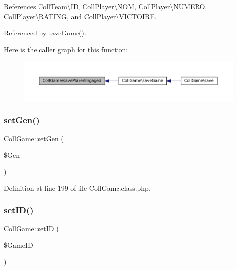 References Coll\+Team\textbackslash{}\+ID, Coll\+Player\textbackslash{}\+N\+OM, Coll\+Player\textbackslash{}\+N\+U\+M\+E\+RO, Coll\+Player\textbackslash{}\+R\+A\+T\+I\+NG, and Coll\+Player\textbackslash{}\+V\+I\+C\+T\+O\+I\+RE.



Referenced by save\+Game().

Here is the caller graph for this function\+:\nopagebreak
\begin{figure}[H]
\begin{center}
\leavevmode
\includegraphics[width=350pt]{class_coll_game_a888d595abf397fe39d4d81833e92ad61_icgraph}
\end{center}
\end{figure}
\mbox{\label{class_coll_game_a6b4d0f6fc49965d0588f4b5399a4fc4e}} 
\subsubsection{\texorpdfstring{set\+Gen()}{setGen()}}
{\footnotesize\ttfamily Coll\+Game\+::set\+Gen (\begin{DoxyParamCaption}\item[{}]{\$\+Gen }\end{DoxyParamCaption})}



Definition at line 199 of file Coll\+Game.\+class.\+php.

\mbox{\label{class_coll_game_a8067b272ef9f022c531344e2a855648d}} 
\subsubsection{\texorpdfstring{set\+I\+D()}{setID()}}
{\footnotesize\ttfamily Coll\+Game\+::set\+ID (\begin{DoxyParamCaption}\item[{}]{\$\+Game\+ID }\end{DoxyParamCaption})}



